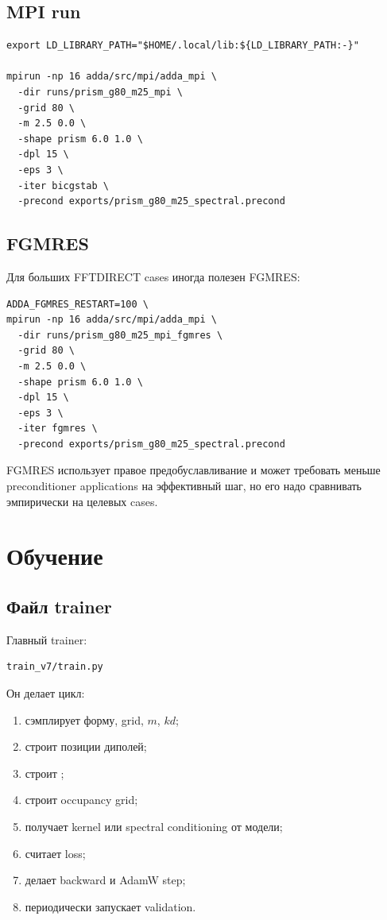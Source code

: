 \documentclass[11pt,a4paper,oneside]{book}
\newcommand{\code}[1]{\texttt{\detokenize{#1}}}
\begin{document}
\section{MPI run}

\begin{lstlisting}
export LD_LIBRARY_PATH="$HOME/.local/lib:${LD_LIBRARY_PATH:-}"

mpirun -np 16 adda/src/mpi/adda_mpi \
  -dir runs/prism_g80_m25_mpi \
  -grid 80 \
  -m 2.5 0.0 \
  -shape prism 6.0 1.0 \
  -dpl 15 \
  -eps 3 \
  -iter bicgstab \
  -precond exports/prism_g80_m25_spectral.precond
\end{lstlisting}

\section{FGMRES}

Для больших FFTDIRECT cases иногда полезен FGMRES:

\begin{lstlisting}
ADDA_FGMRES_RESTART=100 \
mpirun -np 16 adda/src/mpi/adda_mpi \
  -dir runs/prism_g80_m25_mpi_fgmres \
  -grid 80 \
  -m 2.5 0.0 \
  -shape prism 6.0 1.0 \
  -dpl 15 \
  -eps 3 \
  -iter fgmres \
  -precond exports/prism_g80_m25_spectral.precond
\end{lstlisting}

FGMRES использует правое предобуславливание и может требовать меньше
preconditioner applications на эффективный шаг, но его надо сравнивать
эмпирически на целевых cases.

\chapter{Обучение}

\section{Файл trainer}

Главный trainer:

\begin{lstlisting}
train_v7/train.py
\end{lstlisting}

Он делает цикл:

\begin{enumerate}[leftmargin=2em]
  \item сэмплирует форму, grid, $m$, $kd$;
  \item строит позиции диполей;
  \item строит \code{FFTMatVec};
  \item строит occupancy grid;
  \item получает kernel или spectral conditioning от модели;
  \item считает loss;
  \item делает backward и AdamW step;
  \item периодически запускает validation.
\end{enumerate}
\end{document}
